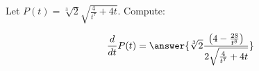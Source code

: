 \documentclass{ximera}
\begin{document}
\begin{exercise}
Let $P(t) = \sqrt[3]{2} \sqrt{\frac{4}{t ^7}+4 t }$. Compute:

\[
\dd{t}P(t) = \answer{ \sqrt[3]{2} \frac{\left(4-\frac{28}{t^8}\right)}{2 \sqrt{\frac{4}{t^7}+4 t }} }
\]
\end{exercise}
\end{document}
